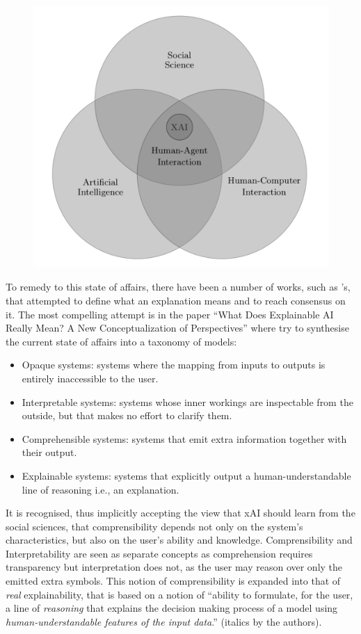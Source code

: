 \begin{figure}[htbp]
\centerline{\includegraphics[width=\columnwidth/2]{literature-review/images/xai-position}}
\caption{\cite{miller2018explanation}}
\label{fig:xai-position}
\end{figure}

To remedy to this state of affairs, there have been a number of works, such as \cite{doshi2017towards}'s, that attempted to define what an explanation means and to reach consensus on it.
The most compelling attempt is in the paper \enquote{What Does Explainable AI Really Mean? A New Conceptualization of Perspectives} where \cite{Doran2018} try to synthesise the current state of affairs into a taxonomy of models:
\begin{itemize}
  \item Opaque systems: systems where the mapping from inputs to outputs is entirely inaccessible to the user.
  \item Interpretable systems: systems whose inner workings are inspectable from the outside, but that makes no effort to clarify them.
  \item Comprehensible systems: systems that emit extra information together with their output.
  \item Explainable systems: systems that explicitly output a human-understandable line of reasoning i.e., an explanation.
\end{itemize}
It is recognised, thus implicitly accepting the view that xAI should learn from the social sciences, that comprensibility depends not only on the system's characteristics, but also on the user's ability and knowledge.
Comprensibility and Interpretability are seen as separate concepts as comprehension requires transparency but interpretation does not, as the user may reason over only the emitted extra symbols.
This notion of comprensibility is expanded into that of \textit{real} explainability, that is based on a notion of \enquote{ability to formulate, for the user, a line of \textit{reasoning} that explains the decision making process of a model using \textit{human-understandable features of the input data}.} (italics by the authors).

